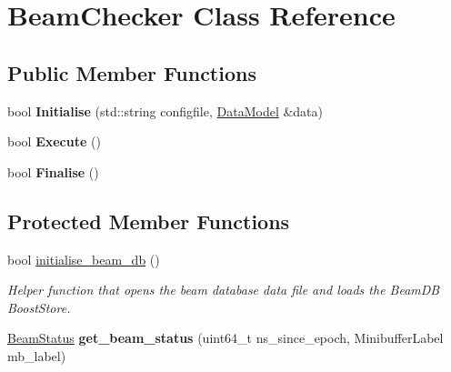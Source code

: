 \hypertarget{classBeamChecker}{
\section{BeamChecker Class Reference}
\label{classBeamChecker}
}
\subsection*{Public Member Functions}
\begin{DoxyCompactItemize}
\item 
\hypertarget{classBeamChecker_a8025fea06b24c363f17764b3cc049ebd}{
bool {\bfseries Initialise} (std::string configfile, \hyperlink{classDataModel}{DataModel} \&data)}
\label{classBeamChecker_a8025fea06b24c363f17764b3cc049ebd}

\item 
\hypertarget{classBeamChecker_a9fd96575f736c2a0a90e9b18fca3bdf7}{
bool {\bfseries Execute} ()}
\label{classBeamChecker_a9fd96575f736c2a0a90e9b18fca3bdf7}

\item 
\hypertarget{classBeamChecker_a1f9078a610f387f97dc6d17a6b98f493}{
bool {\bfseries Finalise} ()}
\label{classBeamChecker_a1f9078a610f387f97dc6d17a6b98f493}

\end{DoxyCompactItemize}
\subsection*{Protected Member Functions}
\begin{DoxyCompactItemize}
\item 
\hypertarget{classBeamChecker_a85643380e26692a3fad55cc4e7d4ea1b}{
bool \hyperlink{classBeamChecker_a85643380e26692a3fad55cc4e7d4ea1b}{initialise\_\-beam\_\-db} ()}
\label{classBeamChecker_a85643380e26692a3fad55cc4e7d4ea1b}

\begin{DoxyCompactList}\small\item\em Helper function that opens the beam database data file and loads the BeamDB BoostStore. \item\end{DoxyCompactList}\item 
\hypertarget{classBeamChecker_a40e731049d58aa141a15f3431b00a764}{
\hyperlink{classBeamStatus}{BeamStatus} {\bfseries get\_\-beam\_\-status} (uint64\_\-t ns\_\-since\_\-epoch, MinibufferLabel mb\_\-label)}
\label{classBeamChecker_a40e731049d58aa141a15f3431b00a764}

\end{DoxyCompactItemize}
